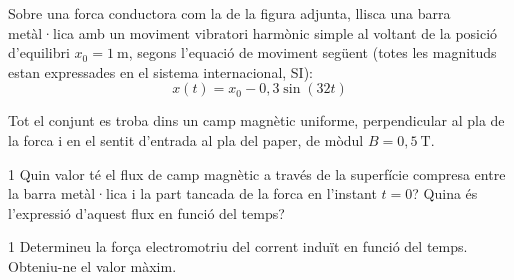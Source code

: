Sobre una forca conductora com la de la figura adjunta, llisca una barra metàl·lica amb un moviment vibratori harmònic simple al voltant de la posició d'equilibri $x_0 = 1\ \mathrm{m}$, segons l'equació de moviment següent (totes les magnituds estan expressades en el sistema internacional, SI):
\[ x(t) = x_0 - 0,3\sin(32t) \]


Tot el conjunt es troba dins un camp magnètic uniforme, perpendicular al pla de la forca i en el sentit d'entrada al pla del paper, de mòdul $B = 0,5\ \mathrm{T}$.

\begin{apartat}{1}
Quin valor té el flux de camp magnètic a través de la superfície compresa entre la barra metàl·lica i la part tancada de la forca en l'instant $t = 0$? Quina és l'expressió d'aquest flux en funció del temps?
\end{apartat}

\begin{apartat}{1}
Determineu la força electromotriu del corrent induït en funció del temps. Obteniu-ne el valor màxim.
\end{apartat}
